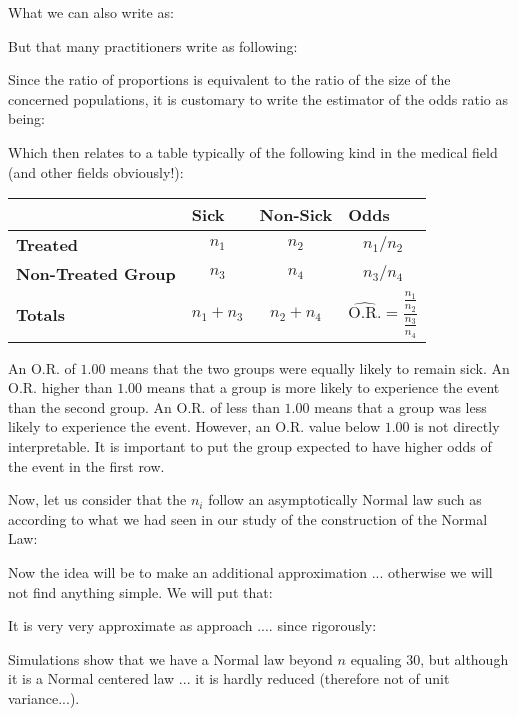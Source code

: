 	What we can also write as:
	
	But that many practitioners write as following:
	
	Since the ratio of proportions is equivalent to the ratio of the size of the concerned populations, it is customary to write the estimator of the odds ratio as being:
	
	Which then relates to a table typically of the following kind in the medical field (and other fields obviously!):
	\begin{table}[H]
		\centering
		\begin{tabular}{|l|c|c|c|}
		\hline
		 & \multicolumn{1}{l|}{\cellcolor[HTML]{9B9B9B}\textbf{Sick}} & \multicolumn{1}{l|}{\cellcolor[HTML]{9B9B9B}\textbf{Non-Sick}} & \multicolumn{1}{l|}{\cellcolor[HTML]{9B9B9B}\textbf{Odds}} \\ \hline
		\cellcolor[HTML]{9B9B9B}\textbf{Treated} & $n_1$ & $n_2$ & $n_1/n_2$ \\ \hline
		\cellcolor[HTML]{9B9B9B}\textbf{Non-Treated Group} & $n_3$ & $n_4$ & $n_3/n_4$\\ \hline
		\cellcolor[HTML]{9B9B9B}\textbf{Totals} & $n_1+n_3$ & $n_2+n_4$ & $\widehat{\text{O.R.}}=\dfrac{\frac{n_1}{n_2}}{\frac{n_3}{n_4}}$\\ \hline
		\end{tabular}
	\end{table}
	\begin{tcolorbox}[title=Remark,colframe=black,arc=10pt]
	 An O.R. of $1.00$ means that the two groups were equally likely to remain sick. An O.R. higher than $1.00$ means that a group is more likely to experience the event than the second group. An O.R. of less than $1.00$ means that a group was less likely to experience the event. However, an O.R. value below $1.00$ is not directly interpretable. It is important to put the group expected to have higher odds of the event in the first row.
	\end{tcolorbox}
	Now, let us consider that the $n_i$ follow an asymptotically Normal law such as according to what we had seen in our study of the construction of the Normal Law:
	
	Now the idea will be to make an additional approximation ... otherwise we will not find anything simple. We will put that:
	
	It is very very approximate as approach .... since rigorously:
	
	Simulations show that we have a Normal law beyond $n$ equaling $30$, but although it is a Normal centered law ... it is hardly reduced (therefore not of unit variance...).
	

